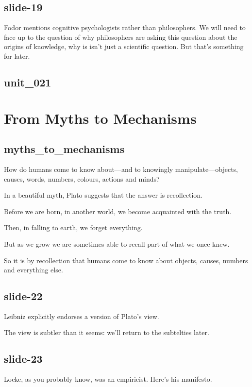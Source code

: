 \documentclass[12pt,\papersize]{extarticle}
\begin{document}
 
 
\subsection{slide-19}
Fodor mentions cognitive psychologists rather than philosophers. We will need to face up to the question of why philosophers are asking this question about the origins of knowledge, why is isn't just a scientific question. But that's something for later.
 
 
 
\subsection{unit\_021}
 
 
\section{From Myths to Mechanisms}
 
 
 
\subsection{myths\_to\_mechanisms}
How do humans come to know about---and to knowingly manipulate---objects, causes, words, numbers, colours, actions and minds?
 
In a beautiful myth, Plato suggests that the answer is recollection.
 
Before we are born, in another world, we become acquainted with the truth.
 
Then, in falling to earth, we forget everything.
 
But as we grow we are sometimes able to recall part of what we once knew.
 
So it is by recollection that humans come to know about objects, causes, numbers and everything else.
 
 
 
\subsection{slide-22}
Leibniz explicitly endorses a version of Plato's view.
 
The view is subtler than it seems: we'll return to the subtelties later.
 
 
 
\subsection{slide-23}
Locke, as you probably know, was an empiricist. Here's his manifesto.
 
\end{document}
